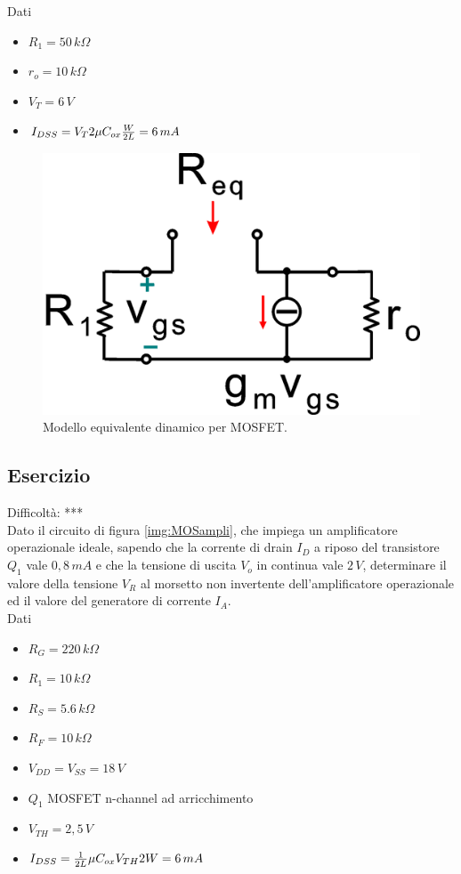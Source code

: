 \documentclass[a4paper,portrait,12pt]{article}
\theoremstyle{definition}
\begin{document}
Dati
\begin{itemize}
\item $R_1=50\,k\Omega$
\item $r_o=10\,k\Omega$
\item $V_T=6\,V$ 
\item $I_{DSS}=V_T2\mu C_{ox}{W\over 2L}=6\,mA$
\end{itemize}

\begin{figure}[H]
\centering
\includegraphics[width=.5\linewidth]{img/elettronicaEs/MOSpiccolo2.pdf}
\caption{Modello equivalente dinamico per MOSFET.}
\label{img:MOSpiccolo2}
\end{figure}


\subsection{Esercizio}

Difficoltà: ***\\

Dato il circuito di figura \ref{img:MOSampli}, che impiega un amplificatore operazionale ideale, sapendo 
che la corrente di drain $I_D$ a riposo del transistore $Q_1$ vale $0,8\,mA$ e che la tensione di uscita 
$V_o$ in continua vale $2\,V$, determinare il valore della tensione $V_R$ al morsetto non invertente 
dell'amplificatore operazionale ed il valore del generatore di corrente $I_A$.\\

Dati
\begin{itemize}
\item $R_G=220\,k\Omega$
\item $R_1=10\,k\Omega$
\item $R_S=5.6\,k\Omega$
\item $R_F=10\,k\Omega$
\item $V_{DD}=V_{SS}=18\,V$
\item $Q_1$ MOSFET n-channel ad arricchimento
\item $V_{TH}=2,5\,V$
\item $I_{DSS}={1\over 2L}\mu C_{ox}V_{TH}2W=6\,mA$
\end{itemize}
\end{document}
